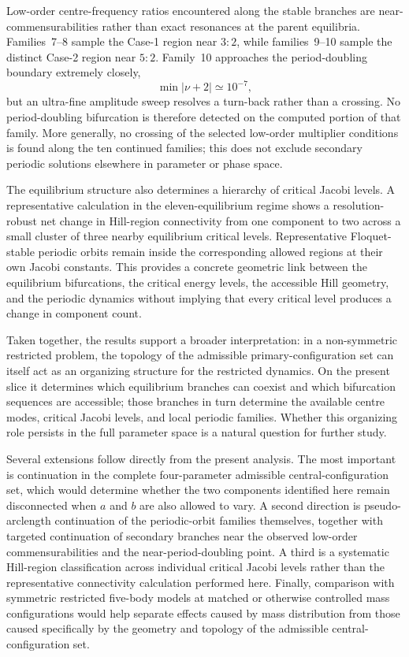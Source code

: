 Low-order centre-frequency ratios encountered along the stable branches are
near-commensurabilities rather than exact resonances at the parent
equilibria. Families~7--8 sample the Case-1 region near $3{:}2$, while
families~9--10 sample the distinct Case-2 region near $5{:}2$. Family~10
approaches the period-doubling boundary extremely closely,
\[
\min |\nu+2|\simeq10^{-7},
\]
but an ultra-fine amplitude sweep resolves a turn-back rather than a
crossing. No period-doubling bifurcation is therefore detected on the
computed portion of that family. More generally, no crossing of the
selected low-order multiplier conditions is found along the ten continued
families; this does not exclude secondary periodic solutions elsewhere in
parameter or phase space.

The equilibrium structure also determines a hierarchy of critical Jacobi
levels. A representative calculation in the eleven-equilibrium regime
shows a resolution-robust net change in Hill-region connectivity from one
component to two across a small cluster of three nearby equilibrium
critical levels. Representative Floquet-stable periodic orbits remain
inside the corresponding allowed regions at their own Jacobi constants.
This provides a concrete geometric link between the equilibrium
bifurcations, the critical energy levels, the accessible Hill geometry, and
the periodic dynamics without implying that every critical level produces
a change in component count.

Taken together, the results support a broader interpretation: in a
non-symmetric restricted problem, the topology of the admissible
primary-configuration set can itself act as an organizing structure for the
restricted dynamics. On the present slice it determines which equilibrium
branches can coexist and which bifurcation sequences are accessible; those
branches in turn determine the available centre modes, critical Jacobi
levels, and local periodic families. Whether this organizing role persists
in the full parameter space is a natural question for further study.

Several extensions follow directly from the present analysis. The most
important is continuation in the complete four-parameter admissible
central-configuration set, which would determine whether the two components
identified here remain disconnected when $a$ and $b$ are also allowed to
vary. A second direction is pseudo-arclength continuation of the
periodic-orbit families themselves, together with targeted continuation of
secondary branches near the observed low-order commensurabilities and the
near-period-doubling point. A third is a systematic Hill-region
classification across individual critical Jacobi levels rather than the
representative connectivity calculation performed here. Finally, comparison
with symmetric restricted five-body models at matched or otherwise
controlled mass configurations would help separate effects caused by mass
distribution from those caused specifically by the geometry and topology
of the admissible central-configuration set.
